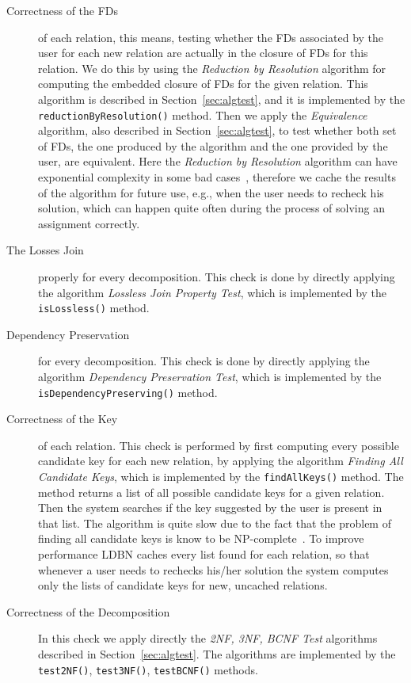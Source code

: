 \begin{description}
  \item [Correctness of the FDs] of each relation, this means, testing whether the FDs associated by the user
    for each new relation are actually in the closure of FDs for this relation. We do this by
    using the \textit{Reduction by Resolution} algorithm for computing the embedded closure of FDs for the given
    relation. This algorithm is described in 
    Section~\ref{sec:algtest}, and it is implemented by the \verb=reductionByResolution()= method. Then we apply
    the \textit{Equivalence} algorithm, also described in 
    Section~\ref{sec:algtest}, to test whether both set of FDs, the one produced by 
    the algorithm and the one provided by the user, are equivalent. Here the \textit{Reduction by Resolution}
    algorithm can have exponential complexity in some bad cases~\cite{p4}, therefore we cache the results
    of the algorithm for future use, e.g., when the user needs to recheck his solution, which can happen
    quite often during the process of solving an assignment correctly. 

	\item [The Losses Join] properly for every decomposition. This check is done by directly applying the 
		algorithm \textit{Lossless Join Property Test}, which is 
		implemented by the \verb=isLossless()= method.
		
	\item [Dependency Preservation] for every decomposition. This check is done by directly applying the 
		algorithm \textit{Dependency Preservation Test}, which is implemented by the 
		\verb=isDependencyPreserving()= method.
		
	\item [Correctness of the Key] of each relation. This check is performed by first computing 
		every possible candidate key 
		for each new relation, by applying the algorithm \textit{Finding All Candidate Keys}, 
		which is implemented
		by the \verb=findAllKeys()= method. The method returns a list of all possible candidate keys
		for a given relation. Then the system searches if the key suggested by the user is 
		present in that list. The algorithm is quite slow due to the fact that the problem of
		finding all candidate keys is know to be NP-complete~\cite{p3}. To improve performance LDBN
		caches every list found for each relation, so that whenever a user needs to rechecks his/her solution
		the system computes only the lists of candidate keys for new, uncached relations.  
		
	\item [Correctness of the Decomposition] In this check we apply directly the 
		\textit{2NF, 3NF, BCNF Test} algorithms described in 
		Section~\ref{sec:algtest}. The algorithms are implemented by the 
		\verb=test2NF()=, \verb=test3NF()=, \verb=testBCNF()= methods.
\end{description}

